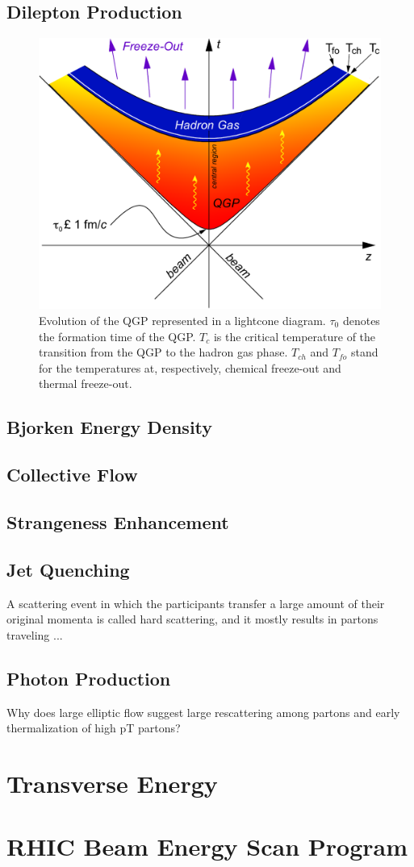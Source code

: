\subsection{Dilepton Production}
\begin{figure}[h]
  \centering
  \includegraphics[width=6.5in]{figures/LightCone1_color-crop_NThesis.pdf}
  \caption{Evolution of the QGP represented in a lightcone diagram. $\tau_{0}$ denotes the formation time of the QGP. $T_{c}$ is the critical temperature of the transition from the QGP to the hadron gas phase. $T_{ch}$ and $T_{fo}$ stand for the temperatures at, respectively, chemical freeze-out and thermal freeze-out. \cite{}}\label{fig:dilepton}
\end{figure}
\subsection{Bjorken Energy Density}
\subsection{Collective Flow}
\subsection{Strangeness Enhancement}
\subsection{Jet Quenching}
A scattering event in which the participants transfer a large amount of their original momenta is called hard scattering, and it mostly results in partons traveling ...
\subsection{Photon Production}
Why does large elliptic flow suggest large rescattering among partons and early thermalization of high pT partons? 
\section{Transverse Energy}
\section{RHIC Beam Energy Scan Program}
